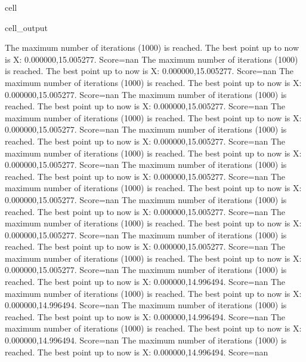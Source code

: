\documentclass[letterpaper,10pt,english]{jupyterBook}
\begin{document}
\begin{sphinxuseclass}{cell}
\begin{sphinxVerbatimOutput}
\begin{sphinxuseclass}{cell_output}
\begin{sphinxVerbatim}[commandchars=\\\{\}]
The maximum number of iterations (1000) is reached. The best point up to now is X: \PYGZob{}0.000000,15.005277\PYGZcb{}. Score=\PYGZhy{}nan
The maximum number of iterations (1000) is reached. The best point up to now is X: \PYGZob{}0.000000,15.005277\PYGZcb{}. Score=\PYGZhy{}nan
The maximum number of iterations (1000) is reached. The best point up to now is X: \PYGZob{}0.000000,15.005277\PYGZcb{}. Score=\PYGZhy{}nan
The maximum number of iterations (1000) is reached. The best point up to now is X: \PYGZob{}0.000000,15.005277\PYGZcb{}. Score=\PYGZhy{}nan
The maximum number of iterations (1000) is reached. The best point up to now is X: \PYGZob{}0.000000,15.005277\PYGZcb{}. Score=\PYGZhy{}nan
The maximum number of iterations (1000) is reached. The best point up to now is X: \PYGZob{}0.000000,15.005277\PYGZcb{}. Score=\PYGZhy{}nan
The maximum number of iterations (1000) is reached. The best point up to now is X: \PYGZob{}0.000000,15.005277\PYGZcb{}. Score=\PYGZhy{}nan
The maximum number of iterations (1000) is reached. The best point up to now is X: \PYGZob{}0.000000,15.005277\PYGZcb{}. Score=\PYGZhy{}nan
The maximum number of iterations (1000) is reached. The best point up to now is X: \PYGZob{}0.000000,15.005277\PYGZcb{}. Score=\PYGZhy{}nan
The maximum number of iterations (1000) is reached. The best point up to now is X: \PYGZob{}0.000000,15.005277\PYGZcb{}. Score=\PYGZhy{}nan
The maximum number of iterations (1000) is reached. The best point up to now is X: \PYGZob{}0.000000,15.005277\PYGZcb{}. Score=\PYGZhy{}nan
The maximum number of iterations (1000) is reached. The best point up to now is X: \PYGZob{}0.000000,15.005277\PYGZcb{}. Score=\PYGZhy{}nan
The maximum number of iterations (1000) is reached. The best point up to now is X: \PYGZob{}0.000000,15.005277\PYGZcb{}. Score=\PYGZhy{}nan
The maximum number of iterations (1000) is reached. The best point up to now is X: \PYGZob{}0.000000,14.996494\PYGZcb{}. Score=\PYGZhy{}nan
The maximum number of iterations (1000) is reached. The best point up to now is X: \PYGZob{}0.000000,14.996494\PYGZcb{}. Score=\PYGZhy{}nan
The maximum number of iterations (1000) is reached. The best point up to now is X: \PYGZob{}0.000000,14.996494\PYGZcb{}. Score=\PYGZhy{}nan
The maximum number of iterations (1000) is reached. The best point up to now is X: \PYGZob{}0.000000,14.996494\PYGZcb{}. Score=\PYGZhy{}nan
The maximum number of iterations (1000) is reached. The best point up to now is X: \PYGZob{}0.000000,14.996494\PYGZcb{}. Score=\PYGZhy{}nan

\end{sphinxVerbatim}
\end{sphinxuseclass}
\end{sphinxVerbatimOutput}
\end{sphinxuseclass}
\end{document}
